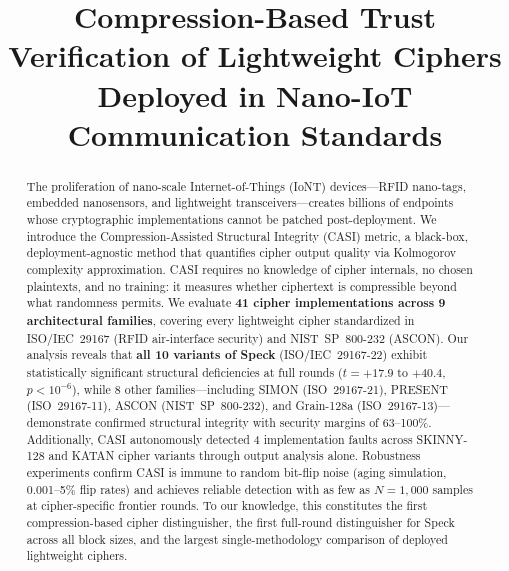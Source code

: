 \documentclass[conference]{IEEEtran}
\begin{document}
\title{Compression-Based Trust Verification of Lightweight Ciphers Deployed in Nano-IoT Communication Standards}

\author{
}

\maketitle

\begin{abstract}
The proliferation of nano-scale Internet-of-Things (IoNT) devices---RFID nano-tags, embedded nanosensors, and lightweight transceivers---creates billions of endpoints whose cryptographic implementations cannot be patched post-deployment.
We introduce the Compression-Assisted Structural Integrity (CASI) metric, a black-box, deployment-agnostic method that quantifies cipher output quality via Kolmogorov complexity approximation.
CASI requires no knowledge of cipher internals, no chosen plaintexts, and no training: it measures whether ciphertext is compressible beyond what randomness permits.
We evaluate \textbf{41 cipher implementations across 9 architectural families}, covering every lightweight cipher standardized in ISO/IEC~29167 (RFID air-interface security) and NIST~SP~800-232 (ASCON).
Our analysis reveals that \textbf{all 10 variants of Speck} (ISO/IEC~29167-22) exhibit statistically significant structural deficiencies at full rounds ($t = +17.9$ to $+40.4$, $p < 10^{-6}$), while 8 other families---including SIMON (ISO~29167-21), PRESENT (ISO~29167-11), ASCON (NIST~SP~800-232), and Grain-128a (ISO~29167-13)---demonstrate confirmed structural integrity with security margins of 63--100\%.
Additionally, CASI autonomously detected 4 implementation faults across SKINNY-128 and KATAN cipher variants through output analysis alone.
Robustness experiments confirm CASI is immune to random bit-flip noise (aging simulation, 0.001--5\% flip rates) and achieves reliable detection with as few as $N = 1{,}000$ samples at cipher-specific frontier rounds.
To our knowledge, this constitutes the first compression-based cipher distinguisher, the first full-round distinguisher for Speck across all block sizes, and the largest single-methodology comparison of deployed lightweight ciphers.
\end{abstract}
\end{document}
